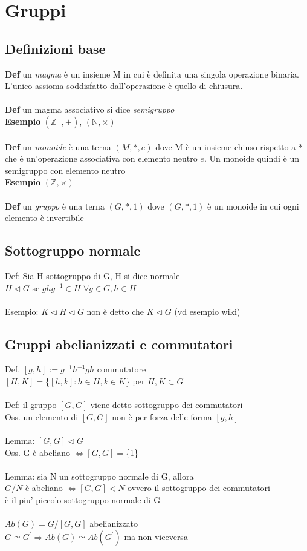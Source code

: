 \documentclass[10pt,a4paper]{article}
\begin{document}
\section{Gruppi}

\subsection{Definizioni base}

\textbf{Def} un \textit{magma} è un insieme M in cui è definita una singola operazione binaria. L'unico assioma soddisfatto dall'operazione è quello di chiusura.\\\\
\textbf{Def} un magma associativo si dice \textit{semigruppo}\\
\textbf{Esempio} $(\mathbb{Z}^+,+)$, $(\mathbb{N},\times)$\\\\
\textbf{Def} un \textit{monoide} è una terna $(M,*,e)$ dove M è un insieme chiuso rispetto a * che è un'operazione associativa con elemento neutro $e$. Un monoide quindi è un semigruppo con elemento neutro\\
\textbf{Esempio} $(\mathbb{Z},\times)$\\\\
\textbf{Def} un \textit{gruppo} è una terna $(G,*,1)$ dove $(G,*,1)$ è un monoide in cui ogni elemento è invertibile
\subsection{Sottogruppo normale}
Def: Sia H sottogruppo di G, H si dice normale\\ 
$H \lhd G$ se $ghg^{-1} \in H$ $\forall g\in G ,h \in H$\\\\
Esempio: $K \lhd H \lhd G$ non è detto che $K \lhd G$ (vd esempio wiki)

\subsection{Gruppi abelianizzati e commutatori}
Def. $[g,h] :=g^{-1}h^{-1}gh$ commutatore\\
$[H,K] = $\{$[h,k] : h\in H,k\in K$\} per $H,K \subset G$\\\\
Def: il gruppo $[G,G]$ viene detto sottogruppo dei commutatori\\
Oss. un elemento di $[G,G]$ non è per forza delle forma $[g,h]$\\\\
Lemma: $[G,G] \lhd G$\\
Oss. G è abeliano $\iff [G,G] = $\{1\}\\\\
Lemma: sia N un sottogruppo normale di G, allora\\
$G/N $ è abeliano $\iff [G,G] \lhd N$ ovvero il sottogruppo dei commutatori \\è il piu' piccolo sottogruppo normale di G\\\\
$Ab(G) = G/[G,G]$ abelianizzato\\
$G \simeq G^{'} \Rightarrow Ab(G) \simeq Ab(G^{'})$ ma non viceversa
\newpage
\end{document}
